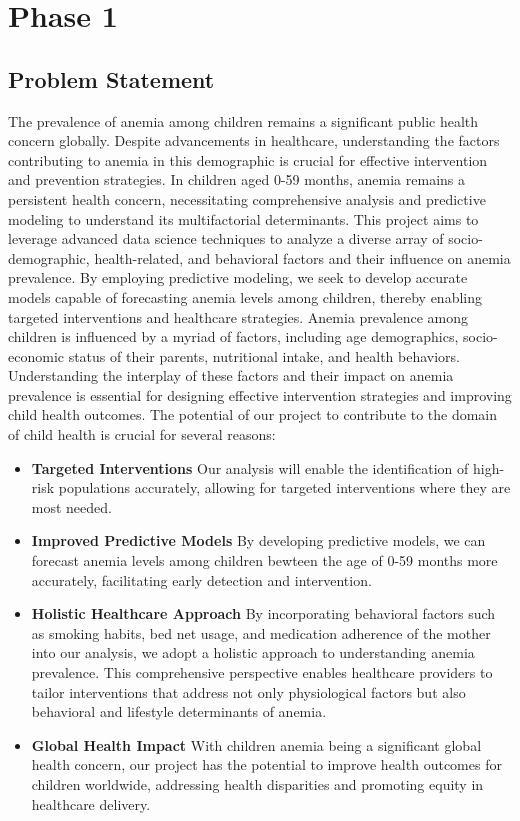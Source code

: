 \chapter{Phase 1}


\section{Problem Statement}

The prevalence of anemia among children remains a significant public health concern globally. Despite advancements in healthcare, understanding the factors contributing to anemia in this demographic is crucial for effective intervention and prevention strategies. In children aged 0-59 months, anemia remains a persistent health concern, necessitating comprehensive analysis and predictive modeling to understand its multifactorial determinants. This project aims to leverage advanced data science techniques to analyze a diverse array of socio-demographic, health-related, and behavioral factors and their influence on anemia prevalence. By employing predictive modeling, we seek to develop accurate models capable of forecasting anemia levels among children, thereby enabling targeted interventions and healthcare strategies. Anemia prevalence among children is influenced by a myriad of factors, including age demographics, socio-economic status of their parents, nutritional intake, and health behaviors. Understanding the interplay of these factors and their impact on anemia prevalence is essential for designing effective intervention strategies and improving child health outcomes. The potential of our project to contribute to the domain of child health is crucial for several reasons:

\begin{itemize}
    \item \textbf{Targeted Interventions} Our analysis will enable the identification of high-risk populations accurately, allowing for targeted interventions where they are most needed.
    \item \textbf{Improved Predictive Models} By developing predictive models, we can forecast anemia levels among children bewteen the age of 0-59 months more accurately, facilitating early detection and intervention.
    \item \textbf{Holistic Healthcare Approach} By incorporating behavioral factors such as smoking habits, bed net usage, and medication adherence of the mother into our analysis, we adopt a holistic approach to understanding anemia prevalence. This comprehensive perspective enables healthcare providers to tailor interventions that address not only physiological factors but also behavioral and lifestyle determinants of anemia.
    \item \textbf{Global Health Impact} With children anemia being a significant global health concern, our project has the potential to improve health outcomes for children worldwide, addressing health disparities and promoting equity in healthcare delivery.
\end{itemize}





